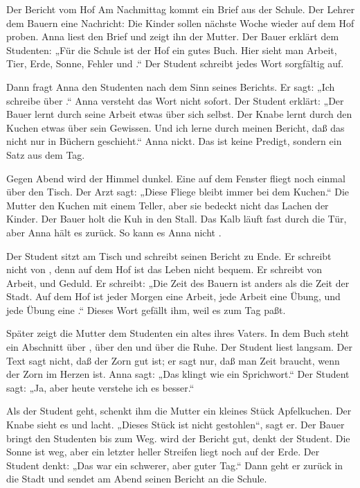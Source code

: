 \documentclass[12pt]{nextbook}
\begin{document}
\begin{readersection}{Der Bericht vom Hof}
Am Nachmittag kommt ein Brief aus der Schule. Der Lehrer  dem Bauern eine Nachricht: Die Kinder sollen nächste Woche wieder auf dem Hof proben. Anna liest den Brief und zeigt ihn der Mutter. Der Bauer erklärt dem Studenten: „Für die Schule ist der Hof ein gutes Buch. Hier sieht man Arbeit, Tier, Erde, Sonne, Fehler und .“ Der Student schreibt jedes Wort sorgfältig auf.

Dann fragt Anna den Studenten nach dem Sinn seines Berichts. Er sagt: „Ich schreibe über .“ Anna versteht das Wort nicht sofort. Der Student erklärt: „Der Bauer lernt durch seine Arbeit etwas über sich selbst. Der Knabe lernt durch den Kuchen etwas über sein Gewissen. Und ich lerne durch meinen Bericht, daß das  nicht nur in Büchern geschieht.“ Anna nickt. Das ist keine Predigt, sondern ein Satz aus dem Tag.

Gegen Abend wird der Himmel dunkel. Eine  auf dem Fenster fliegt noch einmal über den Tisch. Der Arzt sagt: „Diese Fliege bleibt immer bei dem Kuchen.“ Die Mutter  den Kuchen mit einem Teller, aber sie bedeckt nicht das Lachen der Kinder. Der Bauer holt die Kuh in den Stall. Das Kalb läuft fast durch die Tür, aber Anna hält es zurück. So kann es Anna nicht .

Der Student sitzt am Tisch und schreibt seinen Bericht zu Ende. Er schreibt nicht von , denn auf dem Hof ist das Leben nicht bequem. Er schreibt von Arbeit,  und Geduld. Er schreibt: „Die Zeit des Bauern ist anders als die Zeit der Stadt. Auf dem Hof ist jeder Morgen eine Arbeit, jede Arbeit eine Übung, und jede Übung eine .“ Dieses Wort gefällt ihm, weil es zum Tag paßt.

Später zeigt die Mutter dem Studenten ein altes  ihres Vaters. In dem Buch steht ein Abschnitt über , über den  und über die Ruhe. Der Student liest langsam. Der Text sagt nicht, daß der Zorn gut ist; er sagt nur, daß man Zeit braucht, wenn der Zorn im Herzen ist. Anna sagt: „Das klingt wie ein Sprichwort.“ Der Student sagt: „Ja, aber heute verstehe ich es besser.“

Als der Student geht, schenkt ihm die Mutter ein kleines Stück Apfelkuchen. Der Knabe sieht es und lacht. „Dieses Stück ist nicht gestohlen“, sagt er. Der Bauer bringt den Studenten bis zum Weg.  wird der Bericht gut, denkt der Student. Die Sonne ist weg, aber ein letzter heller Streifen liegt noch auf der Erde. Der Student denkt: „Das war ein schwerer, aber guter Tag.“ Dann geht er zurück in die Stadt und sendet am Abend seinen Bericht an die Schule.


\end{readersection}
\end{document}
